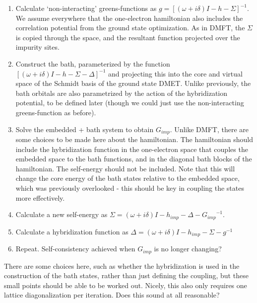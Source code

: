 \documentclass[a4paper,oneside,11pt]{article}
\numberwithin{equation}{section}
\def \Gimp {{G_{imp} }}
\begin{document}
\begin{enumerate}
\item Calculate `non-interacting' greens-functions as $g = [(\omega + i\delta)I - h - \Sigma]^{-1}$. We assume everywhere that the one-electron hamiltonian also includes the correlation potential from the ground state optimization. As in DMFT, the $\Sigma$ is copied through the space, and the resultant function projected over the impurity sites.
\item Construct the bath, parameterized by the function $[(\omega + i\delta)I - h - \Sigma - \Delta]^{-1}$ and projecting this into the core and virtual space of the Schmidt basis of the ground state DMET. Unlike previously, the bath orbitals are also parametrized by the action of the hybridization potential, to be defined later (though we could just use the non-interacting greens-function as before).
\item Solve the embedded + bath system to obtain $\Gimp$. Unlike DMFT, there are some choices to be made here about the hamiltonian. The hamiltonian should include the hybridization function in the one-electron
space that couples the embedded space to the bath functions, and in the diagonal bath blocks of the hamiltonian. The self-energy should not be included. Note that this will change the core energy of the bath states relative to the embedded space, which was previously overlooked - this should be key in coupling the states more effectively.
\item Calculate a new self-energy as $\Sigma = (\omega + i\delta)I - h_{imp} - \Delta - \Gimp^{-1}$. 
\item Calculate a hybridization function as $\Delta = (\omega + i\delta)I - h_{imp} - \Sigma - g^{-1}$
\item Repeat. Self-consistency achieved when $\Gimp$ is no longer changing?
\end{enumerate}

There are some choices here, such as whether the hybridization is used in the construction of the bath states, rather than just defining the coupling, but these small points should be able to be worked out. Nicely, this also only requires one lattice diagonalization per iteration. Does this sound at all reasonable?
\end{document}

